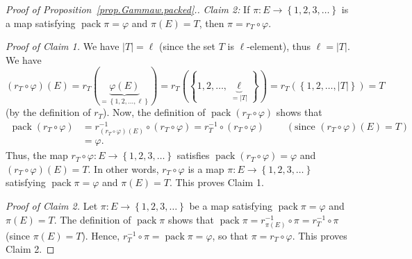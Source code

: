 \documentclass[12pt]{article}
\theoremstyle{plain}
\theoremstyle{definition}
\theoremstyle{remark}
\begin{document}
\begin{proof}[Proof of Proposition~\ref{prop.Gammaw.packed}.]
{\textit{Claim 2:} If $\pi:E\rightarrow\left\{  1,2,3,\ldots\right\}  $ is a
map satisfying $\operatorname{pack}\pi=\varphi$ and $\pi\left(  E\right)  =T$,
then $\pi=r_{T}\circ\varphi$.

\textit{Proof of Claim 1.} We have $\left|T\right| = \ell$ (since the set
$T$ is $\ell$-element), thus $\ell = \left|T\right|$.
We have $\left(  r_{T}\circ\varphi\right)  \left(
E\right)  =r_{T}\left(  \underbrace{\varphi\left(  E\right)  }_{=\left\{
1,2,\ldots,\ell\right\}  }\right)  =r_{T}\left(  \left\{  1,2,\ldots
,\underbrace{\ell}_{=\left\vert T\right\vert }\right\}  \right)
=r_{T}\left(  \left\{
1,2,\ldots,\left\vert T\right\vert \right\}  \right)  =T$ (by the definition
of $r_{T}$). Now, the definition of $\operatorname{pack}\left(  r_{T}%
\circ\varphi\right)  $ shows that
\begin{align*}
\operatorname{pack}\left(  r_{T}\circ\varphi\right)   & =r_{\left(  r_{T}%
\circ\varphi\right)  \left(  E\right)  }^{-1}\circ\left(  r_{T}\circ
\varphi\right)  =r_{T}^{-1}\circ\left(  r_{T}\circ\varphi\right)
\ \ \ \ \ \ \ \ \ \ \left(  \text{since }\left(  r_{T}\circ\varphi\right)
\left(  E\right)  =T\right) \\
& =\varphi.
\end{align*}
Thus, the map $r_{T}\circ\varphi:E\rightarrow\left\{  1,2,3,\ldots\right\}  $
satisfies $\operatorname{pack}\left(  r_{T}\circ\varphi\right)  =\varphi$ and
$\left(  r_{T}\circ\varphi\right)  \left(  E\right)  =T$. In other words,
$r_{T}\circ\varphi$ is a map $\pi:E\rightarrow\left\{  1,2,3,\ldots\right\}  $
satisfying $\operatorname{pack}\pi=\varphi$ and $\pi\left(  E\right)  =T$.
This proves Claim 1.

\textit{Proof of Claim 2.} Let $\pi:E\rightarrow\left\{  1,2,3,\ldots\right\}
$ be a map satisfying $\operatorname{pack}\pi=\varphi$ and $\pi\left(
E\right)  =T$. The definition of $\operatorname{pack}\pi$ shows that
$\operatorname{pack}\pi=r_{\pi\left(  E\right)  }^{-1}\circ\pi=r_{T}^{-1}%
\circ\pi$ (since $\pi\left(  E\right)  =T$). Hence, $r_{T}^{-1}\circ
\pi=\operatorname{pack}\pi=\varphi$, so that $\pi=r_{T}\circ\varphi$. This
proves Claim 2.

}
\end{proof}
\end{document}
